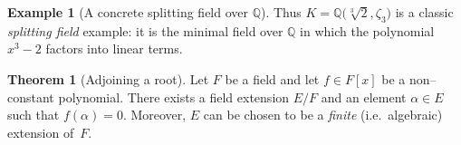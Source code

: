 \documentclass[12pt]{article}
\theoremstyle{definition} %
\newtheorem{theorem}{Theorem}
\newtheorem{example}{Example}
\theoremstyle{plain} %
\begin{document}
\begin{example}[A concrete splitting field over $\mathbb{Q}$]
      \bigskip
      \noindent
      Thus $K=\mathbb{{Q}}\!\bigl(\sqrt[3]{2},\zeta_{3}\bigr)$ is a classic
      \emph{splitting field} example: it is the minimal field over
      $\mathbb{{Q}}$ in which the polynomial $x^{3}-2$ factors into
      linear terms.
      \end{example}
\begin{theorem}[Adjoining a root]\label{thm:adjoin–root}
  Let \(F\) be a field and let \(f\in F[x]\) be a non–constant
  polynomial.  
  There exists a field extension \(E/F\) and an element
  \(\alpha\in E\) such that \(f(\alpha)=0\).
  Moreover, \(E\) can be chosen to be a \emph{finite} (i.e.\ algebraic)
  extension of~\(F\).
  \end{theorem}
  
\end{document}

